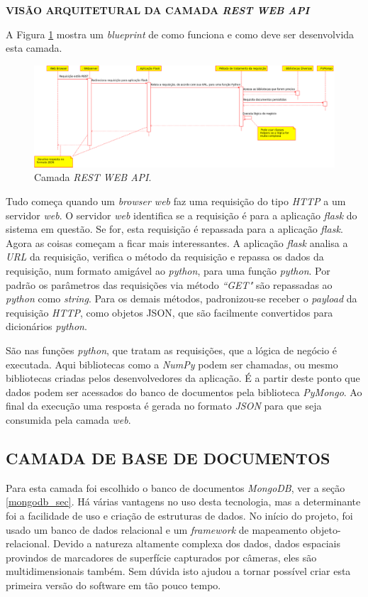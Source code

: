 \textbf{VISÃO ARQUITETURAL DA CAMADA \emph{REST WEB API}} 

A Figura \ref{camada_api} mostra um \emph{blueprint} de como funciona e como deve ser desenvolvida esta camada.
\begin{figure}[ht]
	\centering
	\includegraphics[width=15cm]{figuras/camada_api.eps}
	\caption{Camada \emph{REST WEB API}.}
	\label{camada_api}
\end{figure}

Tudo começa quando um \emph{browser web} faz uma requisição do tipo \emph{HTTP} a um servidor \emph{web}. 
O servidor \emph{web} identifica se a requisição é para a aplicação \emph{flask} do sistema em questão. 
Se for, esta requisição é repassada para a aplicação \emph{flask}. 
Agora as coisas começam a ficar mais interessantes. 
A aplicação \emph{flask} analisa a \emph{URL} da requisição, verifica o método da requisição e repassa os dados da requisição, num formato amigável ao \emph{python}, para uma função \emph{python}. 
Por padrão os parâmetros das requisições via método \emph{``GET"} são repassadas ao \emph{python} como \emph{string}. 
Para os demais métodos, padronizou-se receber o \emph{payload} da requisição \emph{HTTP}, como objetos JSON, que são facilmente convertidos para dicionários \emph{python}.

São nas funções \emph{python}, que tratam as requisições, que a lógica de negócio é executada. 
Aqui bibliotecas como a \emph{NumPy} podem ser chamadas, ou mesmo bibliotecas criadas pelos desenvolvedores da aplicação. 
É a partir deste ponto que dados podem ser acessados do banco de documentos pela biblioteca \emph{PyMongo}. 
Ao final da execução uma resposta é gerada no formato \emph{JSON} para que seja consumida pela camada \emph{web}.



\subsection {CAMADA DE BASE DE DOCUMENTOS}

Para esta camada foi escolhido o banco de documentos \emph{MongoDB}, ver a seção \ref{mongodb_sec}. 
Há várias vantagens no uso desta tecnologia, mas a determinante foi a facilidade de uso e criação de estruturas de dados. 
No início do projeto, foi usado um banco de dados relacional e um \emph{framework} de mapeamento objeto-relacional. 
Devido a natureza altamente complexa dos dados, dados espaciais provindos de marcadores de superfície capturados por câmeras, eles são multidimensionais também. 
Sem dúvida isto ajudou a tornar possível criar esta primeira versão do software em tão pouco tempo.

